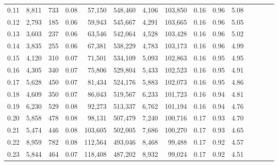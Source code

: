 \begin{tabular}{rrrcrrrrrrrrrrr}
0.11 &   8,811 &    733 &                                       0.08 &   57,150 &  548,460 &    4,106 &  103,850 &  0.16 &  0.96 &                         5.08 \\
0.12 &   2,793 &    185 &                                       0.06 &   59,943 &  545,667 &    4,291 &  103,665 &  0.16 &  0.96 &                         5.05 \\
0.13 &   3,603 &    237 &                                       0.06 &   63,546 &  542,064 &    4,528 &  103,428 &  0.16 &  0.96 &                         5.02 \\
0.14 &   3,835 &    255 &                                       0.06 &   67,381 &  538,229 &    4,783 &  103,173 &  0.16 &  0.96 &                         4.99 \\
0.15 &   4,120 &    310 &                                       0.07 &   71,501 &  534,109 &    5,093 &  102,863 &  0.16 &  0.95 &                         4.95 \\
0.16 &   4,305 &    340 &                                       0.07 &   75,806 &  529,804 &    5,433 &  102,523 &  0.16 &  0.95 &                         4.91 \\
0.17 &   5,628 &    450 &                                       0.07 &   81,434 &  524,176 &    5,883 &  102,073 &  0.16 &  0.95 &                         4.86 \\
0.18 &   4,609 &    350 &                                       0.07 &   86,043 &  519,567 &    6,233 &  101,723 &  0.16 &  0.94 &                         4.81 \\
0.19 &   6,230 &    529 &                                       0.08 &   92,273 &  513,337 &    6,762 &  101,194 &  0.16 &  0.94 &                         4.76 \\
0.20 &   5,858 &    478 &                                       0.08 &   98,131 &  507,479 &    7,240 &  100,716 &  0.17 &  0.93 &                         4.70 \\
0.21 &   5,474 &    446 &                                       0.08 &  103,605 &  502,005 &    7,686 &  100,270 &  0.17 &  0.93 &                         4.65 \\
0.22 &   8,959 &    782 &                                       0.08 &  112,564 &  493,046 &    8,468 &   99,488 &  0.17 &  0.92 &                         4.57 \\
0.23 &   5,844 &    464 &                                       0.07 &  118,408 &  487,202 &    8,932 &   99,024 &  0.17 &  0.92 &                         4.51 \\

\end{tabular}
